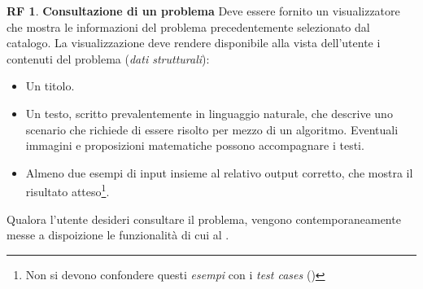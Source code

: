 \documentclass[11pt, a4paper]{article}
\theoremstyle{definition}
\newtheorem{funcreq}{RF} %
\begin{document}
\begin{funcreq}
\label{seeproblem}
\textbf{Consultazione di un problema }
Deve essere fornito un visualizzatore che mostra le informazioni del
problema precedentemente selezionato dal catalogo. La visualizzazione
deve rendere disponibile alla vista dell'utente i contenuti del
problema (\textit{dati strutturali}):
\begin{itemize}
    \item Un titolo.

    \item Un testo, scritto prevalentemente in linguaggio naturale,
    che descrive uno scenario che richiede di essere risolto per mezzo
    di un algoritmo. Eventuali immagini e proposizioni matematiche
    possono accompagnare i testi.

    \item Almeno due esempi di input insieme al relativo output corretto,
    che mostra il risultato atteso\footnote{Non si devono confondere questi \textit{esempi}
    con i \textit{test cases} (\textcolor{blue}{})}.
\end{itemize}
Qualora l'utente desideri consultare il problema, vengono contemporaneamente
messe a dispoizione le funzionalità di cui al \textcolor{blue}{}.
\end{funcreq}
\end{document}
